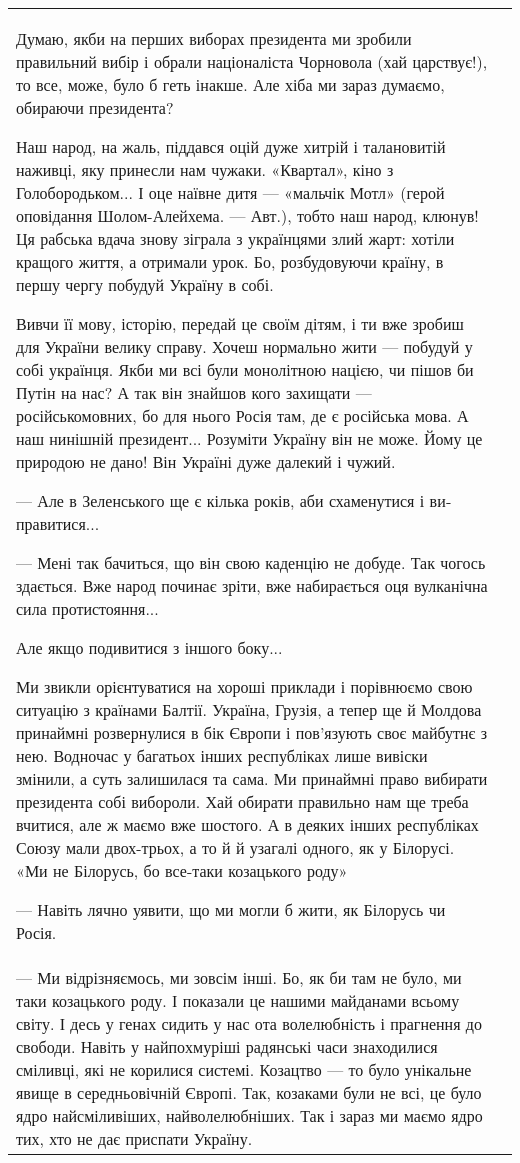 \begin{longtable}{|p{}|p{}|}
\\


Думаю, якби на перших виборах президента ми зробили правильний вибір і обрали
націоналіста Чорновола (хай царствує!), то все, може, було б геть інакше. Але
хіба ми зараз думаємо, обираючи президента?

Наш народ, на жаль, піддався оцій дуже хитрій і талановитій наживці, яку
принесли нам чужаки. «Квартал», кіно з Голобородьком... І оце наївне дитя —
«мальчік Мотл» (герой оповідання Шолом-Алейхема. — Авт.), тобто наш народ,
клюнув! Ця рабська вдача знову зіграла з українцями злий жарт: хотіли кращого
життя, а отримали урок. Бо, розбудовуючи країну, в першу чергу побудуй Україну
в собі.

Вивчи її мову, історію, передай це своїм дітям, і ти вже зробиш для України
велику справу. Хочеш нормально жити — побудуй у собі українця. Якби ми всі були
монолітною нацією, чи пішов би Путін на нас? А так він знайшов кого захищати —
російськомовних, бо для нього Росія там, де є російська мова. А наш нинішній
президент... Розуміти Україну він не може. Йому це природою не дано! Він
Україні дуже далекий і чужий.


— Але в Зеленського ще є кілька років, аби схаменутися і ви­правитися...


— Мені так бачиться, що він свою каденцію не добуде. Так чогось здається. Вже
народ починає зріти, вже набирається оця вулканічна сила протистояння...

Але якщо подивитися з іншого боку...

Ми звикли орієнтуватися на хороші приклади і порівнюємо свою ситуацію з країнами Балтії. Україна, Грузія, а тепер ще й Молдова принаймні розвернулися в бік Європи і пов’язують своє майбутнє з нею. Водночас у багатьох інших республіках лише вивіски змінили, а суть залишилася та сама. Ми принаймні право вибирати президента собі вибороли. Хай обирати правильно нам ще треба вчитися, але ж маємо вже шостого. А в деяких інших республіках Союзу мали двох-трьох, а то й й узагалі одного, як у Білорусі.
«Ми не Білорусь, бо все-таки козацького роду»

— Навіть лячно уявити, що ми могли б жити, як Білорусь чи Росія.

& \\

— Ми відрізняємось, ми зов­сім інші. Бо, як би там не було, ми таки козацького
роду. І показали це нашими майданами всьому світу. І десь у генах сидить у нас
ота волелюбність і прагнення до свободи. Навіть у найпо­хмуріші радянські часи
знаходилися сміливці, які не корилися системі. Козацтво — то було унікальне
явище в середньовічній Європі. Так, козаками були не всі, це було ядро
найсміливіших, найволелюбніших. Так і зараз ми маємо ядро тих, хто не дає
приспати Україну.


\end{longtable}
